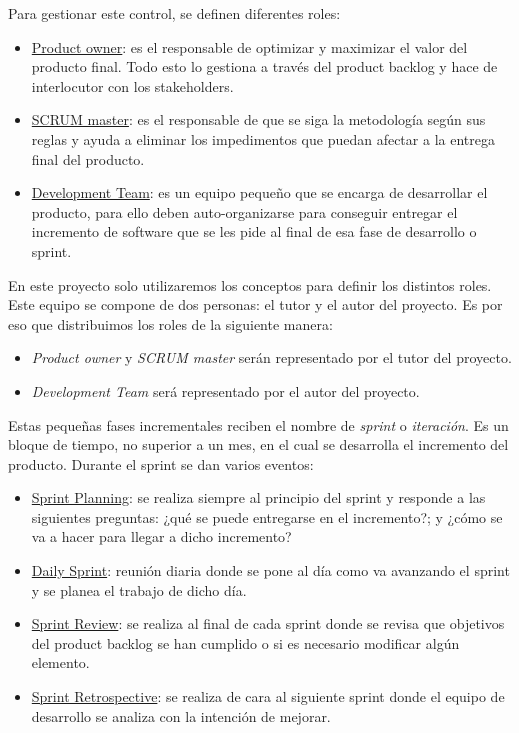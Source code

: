 \documentclass[a4paper, 12pt]{book}
\begin{document}
Para gestionar este control, se definen diferentes roles:

\begin{itemize}
    \item \underline{Product owner}: es el responsable de optimizar y maximizar el valor del producto final. Todo esto lo gestiona a través del product backlog y hace de interlocutor con los stakeholders.
    \item \underline{SCRUM master}: es el responsable de que se siga la metodología según sus reglas y ayuda a eliminar los impedimentos que puedan afectar a la entrega final del producto.
    \item \underline{Development Team}: es un equipo pequeño que se encarga de desarrollar el producto, para ello deben auto-organizarse para conseguir entregar el incremento de software que se les pide al final de esa fase de desarrollo o sprint.
\end{itemize}


En este proyecto solo utilizaremos los conceptos para definir los distintos roles. Este equipo se compone de dos personas: el tutor y el autor del proyecto. Es por eso que distribuimos los roles de la siguiente manera:

\begin{itemize}
    \item \textit{Product owner} y \textit{SCRUM master} serán representado por el tutor del proyecto.
    \item \textit{Development Team} será representado por el autor del proyecto.
\end{itemize}

Estas pequeñas fases incrementales reciben el nombre de \textit{sprint} o \textit{iteración}. Es un bloque de tiempo, no superior a un mes, en el cual se desarrolla el incremento del producto. Durante el sprint se dan varios eventos:

\begin{itemize}
    \item \underline{Sprint Planning}: se realiza siempre al principio del sprint y responde a las siguientes preguntas: ¿qué se puede entregarse en el incremento?; y ¿cómo se va a hacer para llegar a dicho incremento?
    \item \underline{Daily Sprint}: reunión diaria donde se pone al día como va avanzando el sprint y se planea el trabajo de dicho día.
    \item \underline{Sprint Review}: se realiza al final de cada sprint donde se revisa que objetivos del product backlog se han cumplido o si es necesario modificar algún elemento.
    \item \underline{Sprint Retrospective}: se realiza de cara al siguiente sprint donde el equipo de desarrollo se analiza con la intención de mejorar.
\end{itemize}
\end{document}
